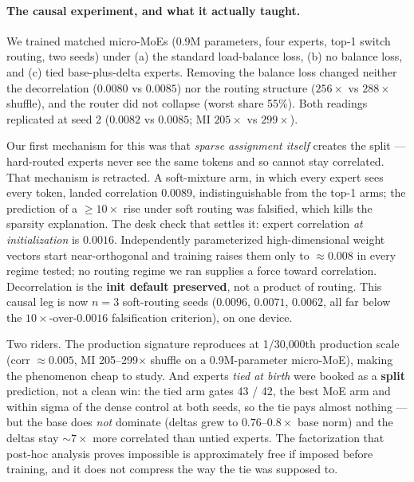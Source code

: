 \documentclass[11pt]{article}
\begin{document}
\paragraph{The causal experiment, and what it actually taught.}
We trained matched micro-MoEs (0.9M parameters, four experts, top-1 switch
routing, two seeds) under (a) the standard load-balance loss, (b) no balance
loss, and (c) tied base-plus-delta experts. Removing the balance loss changed
neither the decorrelation ($0.0080$ vs $0.0085$) nor the routing structure
($256\times$ vs $288\times$ shuffle), and the router did not collapse (worst
share 55\%). %
Both readings replicated at seed 2 ($0.0082$ vs $0.0085$; MI $205\times$ vs
$299\times$). %

Our first mechanism for this was that \emph{sparse assignment itself} creates the
split --- hard-routed experts never see the same tokens and so cannot stay
correlated. That mechanism is retracted. A soft-mixture arm, in which every
expert sees every token, landed correlation $0.0089$, indistinguishable from the
top-1 arms; the prediction of a $\geq 10\times$ rise under soft routing was
falsified, which kills the sparsity explanation. %
The desk check that settles it: expert correlation \emph{at initialization} is
$0.0016$. %
Independently parameterized high-dimensional weight vectors start near-orthogonal
and training raises them only to $\approx 0.008$ in every regime tested; no
routing regime we ran supplies a force toward correlation. Decorrelation is the
\textbf{init default preserved}, not a product of routing. This causal leg is now
$n{=}3$ soft-routing seeds ($0.0096$, $0.0071$, $0.0062$, all far below the
$10\times$-over-$0.0016$ falsification criterion), on one device.

Two riders. The production signature reproduces at 1/30{,}000th production scale
(corr $\approx 0.005$, MI 205--299$\times$ shuffle on a 0.9M-parameter
micro-MoE), making the phenomenon cheap to study. %
And experts \emph{tied at birth} were booked as a \textbf{split} prediction, not
a clean win: the tied arm gates 43 / 42, the best MoE arm and within sigma of the
dense control at both seeds, so the tie pays almost nothing --- but the base does
\emph{not} dominate (deltas grew to $0.76$--$0.8\times$ base norm) and the deltas
stay $\sim7\times$ more correlated than untied experts. %
The factorization that post-hoc analysis proves impossible is approximately free
if imposed before training, and it does not compress the way the tie was supposed
to.
\end{document}
